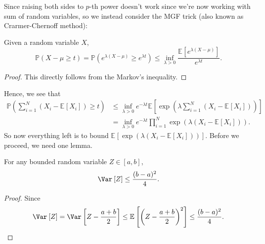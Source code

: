 \begin{answer}
	Since raising both sides to \(p\)-th power doesn't work since we're now working with sum of random variables, so we instead consider the MGF trick (also known as Crarmer-Chernoff method):

	\begin{lemma}\label{lma:Crarmer-Chernoff}
		Given a random variable \(X\),
		\[
			\mathbb{P} (X - \mu \geq t) = \mathbb{P} (e^{\lambda (X - \mu )} \geq e^{\lambda t}) \leq \inf _{\lambda > 0} \frac{\mathbb{E}_{}\left[e^{\lambda (X-\mu )} \right] }{e^{\lambda t}}.
		\]
	\end{lemma}
	\begin{proof}
		This directly follows from the Markov's inequality.
	\end{proof}

	Hence, we see that
	\[
		\begin{split}
			\mathbb{P} \left( \sum_{i=1}^{N} (X_i - \mathbb{E}_{}\left[X_i \right] ) \geq t \right)
			 & \leq \inf _{\lambda  > 0} e^{-\lambda t} \mathbb{E}_{}\left[\exp (\lambda \sum_{i=1}^{N} (X_i - \mathbb{E}_{}\left[X_i \right] )) \right] \\
			 & = \inf _{\lambda > 0} e^{-\lambda t} \prod_{i=1}^{N} \exp (\lambda (X_i - \mathbb{E}_{}\left[X_i \right] )).
		\end{split}
	\]
	So now everything left is to bound \(\mathbb{E}_{}\left[ \exp (\lambda (X_i - \mathbb{E}_{}\left[X_i \right] )) \right]\). Before we proceed, we need one lemma.

	\begin{lemma}\label{lma:variance-bound}
		For any bounded random variable \(Z\in [a, b]\),
		\[
			\Var_{}\left[Z \right] \leq \frac{(b-a)^2}{4}.
		\]
	\end{lemma}
	\begin{proof}
		Since
		\[
			\Var_{}\left[Z \right]
			= \Var_{}\left[Z - \frac{a+b}{2} \right]
			\leq \mathbb{E}_{}\left[\left( Z - \frac{a+b}{2} \right) ^2 \right]
			\leq \frac{(b-a)^2}{4}.
		\]
	\end{proof}


\end{answer}

